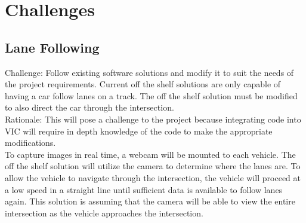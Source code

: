 \documentclass [11pt]{article}
\begin{document}
%
%
%
\pagebreak


\section{Challenges}

\subsection{Lane Following}

Challenge:  Follow existing software solutions and modify it to suit the needs of the project requirements.  Current off the shelf solutions are only capable of having a car follow lanes on a track.  The off the shelf solution must be modified to also direct the car through the intersection.   \\

Rationale: This will pose a challenge to the project because integrating code into VIC will require in depth knowledge of the code to make the appropriate modifications. \\



To capture images in real time, a webcam will be mounted to each vehicle.  The off the shelf solution will utilize the camera to determine where the lanes are. To allow the vehicle to navigate through the intersection, the vehicle will proceed at a low speed in a straight line until sufficient data is available to follow lanes again. This solution is assuming that the camera will be able to view the entire intersection as the vehicle approaches the intersection. 
\end{document}

